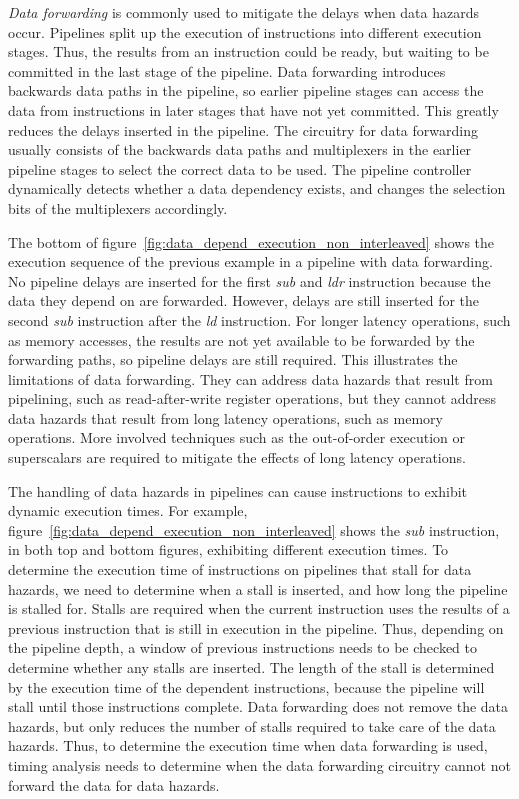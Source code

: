 \emph{Data forwarding} is commonly used to mitigate the delays when data hazards occur.
Pipelines split up the execution of instructions into different execution stages. 
Thus, the results from an instruction could be ready, but waiting to be committed in the last stage of the pipeline.
Data forwarding introduces backwards data paths in the pipeline, so earlier pipeline stages can access the data from instructions in later stages that have not yet committed.
This greatly reduces the delays inserted in the pipeline.
The circuitry for data forwarding usually consists of the backwards data paths and multiplexers in the earlier pipeline stages to select the correct data to be used.    
The pipeline controller dynamically detects whether a data dependency exists, and changes the selection bits of the multiplexers accordingly.

The bottom of figure~\ref{fig:data_depend_execution_non_interleaved} shows the execution sequence of the previous example in a pipeline with data forwarding.
No pipeline delays are inserted for the first \emph{sub} and \emph{ldr} instruction because the data they depend on are forwarded.
However, delays are still inserted for the second \emph{sub} instruction after the \emph{ld} instruction.
For longer latency operations, such as memory accesses, the results are not yet available to be forwarded by the forwarding paths, so pipeline delays are still required. 
This illustrates the limitations of data forwarding.
They can address data hazards that result from pipelining, such as read-after-write register operations, but they cannot address data hazards that result from long latency operations, such as memory operations.
More involved techniques such as the out-of-order execution or superscalars are required to mitigate the effects of long latency operations.

The handling of data hazards in pipelines can cause instructions to exhibit dynamic execution times.  
For example, figure~\ref{fig:data_depend_execution_non_interleaved} shows the \emph{sub} instruction, in both top and bottom figures, exhibiting different execution times. 
To determine the execution time of instructions on pipelines that stall for data hazards, we need to determine when a stall is inserted, and how long the pipeline is stalled for.
Stalls are required when the current instruction uses the results of a previous instruction that is still in execution in the pipeline.
Thus, depending on the pipeline depth, a window of previous instructions needs to be checked to determine whether any stalls are inserted.     
The length of the stall is determined by the execution time of the dependent instructions, because the pipeline will stall until those instructions complete.
Data forwarding does not remove the data hazards, but only reduces the number of stalls required to take care of the data hazards.  
Thus, to determine the execution time when data forwarding is used, timing analysis needs to determine when the data forwarding circuitry cannot not forward the data for data hazards.

